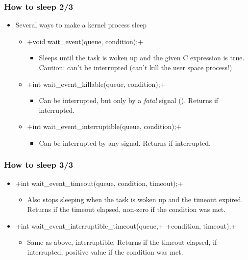 \begin{frame}[fragile]
  \frametitle{How to sleep 2/3}
  \begin{itemize}
  \item Several ways to make a kernel process sleep
    \begin{itemize}
    \item {}+void wait_event(queue, condition);+
      \begin{itemize}
      \item Sleeps until the task is woken up and the given C
        expression is true. Caution: can't be interrupted (can't kill
        the user space process!)
      \end{itemize}
    \item {}+int wait_event_killable(queue, condition);+
      \begin{itemize}
      \item Can be interrupted, but only by a \emph{fatal} signal
        (). Returns \code{-} if interrupted.
      \end{itemize}
    \item {}+int wait_event_interruptible(queue, condition);+
      \begin{itemize}
      \item Can be interrupted by any signal. Returns
        \code{-} if interrupted.
      \end{itemize}
    \end{itemize}
  \end{itemize}
\end{frame}

\begin{frame}[fragile]
  \frametitle{How to sleep 3/3}
  \begin{itemize}
  \item {}+int wait_event_timeout(queue, condition, timeout);+
    \begin{itemize}
    \item Also stops sleeping when the task is woken up and the
      timeout expired. Returns  if the timeout elapsed, non-zero if
      the condition was met.
    \end{itemize}
  \item {}+int wait_event_interruptible_timeout(queue,+
    +condition, timeout);+
    \begin{itemize}
    \item Same as above, interruptible. Returns  if the timeout
      elapsed, \code{-} if interrupted, positive value if
      the condition was met.
    \end{itemize}
  \end{itemize}
\end{frame}

